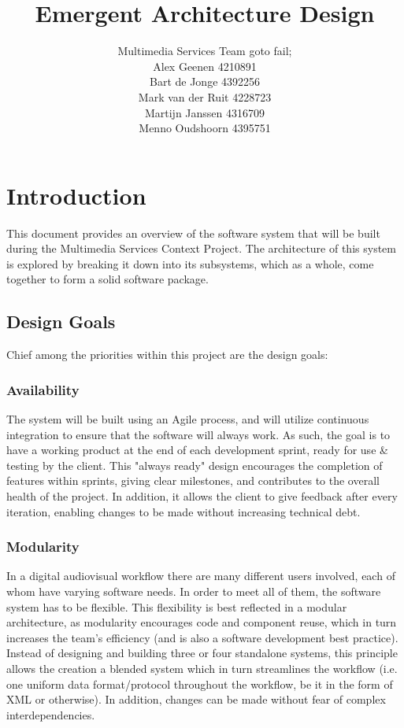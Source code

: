 \documentclass[11pt,twoside,a4paper]{article}
\title{Emergent Architecture Design}
\author{
  Multimedia Services Team goto fail;\\
  Alex Geenen 4210891\\
  Bart de Jonge 4392256\\
  Mark van der Ruit 4228723\\
  Martijn Janssen 4316709\\
  Menno Oudshoorn 4395751
}
\begin{document}
\maketitle
\clearpage

\tableofcontents
\clearpage

\section{Introduction} \label{sec:intro}
This document provides an overview of the software system that will be built during the Multimedia Services Context Project. The architecture of this system is explored by breaking it down into its subsystems, which as a whole, come together to form a solid software package. 

\subsection{Design Goals}
Chief among the priorities within this project are the design goals:

\subsubsection{Availability}
The system will be built using an Agile process, and will utilize continuous integration to ensure that the software will always work. As such, the goal is to have a working product at the end of each development sprint, ready for use \& testing by the client. This "always ready" design encourages the completion of features within sprints, giving clear milestones, and contributes to the overall health of the project. In addition, it allows the client to give feedback after every iteration, enabling changes to be made without increasing technical debt.

\subsubsection{Modularity}
In a digital audiovisual workflow there are many different users involved, each of whom have varying software needs. In order to meet all of them, the software system has to be flexible. This flexibility is best reflected in a modular architecture, as modularity encourages code and component reuse, which in turn increases the team's efficiency (and is also a software development best practice). Instead of designing and building three or four standalone systems, this principle allows the creation a blended system which in turn streamlines the workflow (i.e. one uniform data format/protocol throughout the workflow, be it in the form of XML or otherwise). In addition, changes can be made without fear of complex interdependencies.
\end{document}
